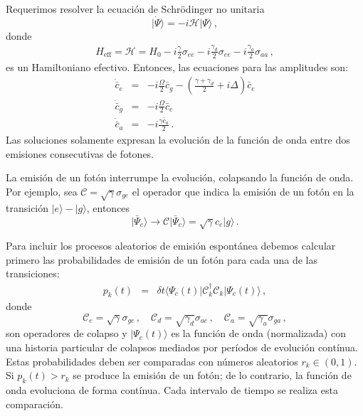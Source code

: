 \documentclass[twocolumn,aps,eqsecnum,showkeys,amsmath]{revtex4}
\newcommand{\mcC}{\mathcal{C}}
\providecommand{\bra}[1]{\langle #1 \rvert}
\providecommand{\ket}[1]{\lvert #1 \rangle}
\begin{document}
Requerimos resolver la ecuaci\'on de Schr\"odinger no unitaria
%
\begin{equation}
\ket{\dot{\Psi}} = -i \mathcal{H} \ket{\Psi} \,,
\end{equation}
donde 
%
\begin{eqnarray}
H_{\mathrm{eff}} = \mathcal{H} =
H_0 -i \frac{\gamma}{2} \sigma_{ee} 
	-i \frac{\gamma_d}{2} \sigma_{ee} -i \frac{\gamma_a}{2} \sigma_{aa} \,, 
\end{eqnarray}
es un Hamiltoniano efectivo. Entonces, las ecuaciones para las amplitudes 
son:   
%
\begin{subequations}
\label{eq:jumpSSEamp}
\begin{eqnarray}
\dot{\bar{c}}_e &=& -i \frac{\Omega}{2} \bar{c}_g  
	-\left( \frac{\gamma +\gamma_d}{2} +i \Delta \right) \bar{c}_e \\ 
%
\dot{\bar{c}}_g &=& -i \frac{\Omega}{2} \bar{c}_e  \\
%
\dot{\bar{c}}_a &=& -i\frac{\gamma \bar{c}_a}{2} \,.    
\end{eqnarray}
\end{subequations}
%
%
%
Las soluciones solamente expresan la evoluci\'on de la funci\'on de onda 
entre dos emisiones consecutivas de fotones. 

La emisi\'on de un fot\'on interrumpe la evoluci\'on, colapsando la funci\'on 
de onda. Por ejemplo, sea $\mathcal{C} = \sqrt{\gamma} \sigma_{ge}$ el 
operador que indica la emisi\'on de un fot\'on en la transici\'on 
$\ket{e} - \ket{g}$, entonces  
%
\begin{equation}
\ket{\bar{\Psi}_c} \to \mathcal{C} \ket{\bar{\Psi}_c} 
	= \sqrt{\gamma} c_e \ket{g} \,. 
\end{equation}

Para incluir los procesos 
aleatorios de emisi\'on espont\'anea debemos calcular primero las 
probabilidades de emisi\'on de un fot\'on para cada una de las transiciones: 
%
\begin{eqnarray}
p_k(t) &=& \delta t \bra{\Psi_c (t)} \mcC_k^\dag \mcC_k \ket{\Psi_c (t)} 	\,,
\end{eqnarray}
donde 
%
\begin{equation}
\mcC_e = \sqrt{\gamma} \sigma_{ge} \,, \quad 
	\mcC_d = \sqrt{\gamma_d} \sigma_{ae} \,, \quad 
	\mcC_a = \sqrt{\gamma_a} \sigma_{ga} \,, 
\end{equation}
son operadores de colapso y $\ket{\Psi_c (t)}$ es la funci\'on de onda 
(normalizada) con una historia particular de colapsos mediados por 
per\'iodos de evoluci\'on cont\'inua.  Estas probabilidades deben ser 
comparadas con n\'umeros aleatorios $r_k \in (0,1)$. Si $p_k(t) > r_k$ 
se produce la emisi\'on de un fot\'on; de lo contrario, la funci\'on de onda 
evoluciona de forma cont\'inua. Cada intervalo de tiempo se realiza esta 
comparaci\'on.  
\end{document}
